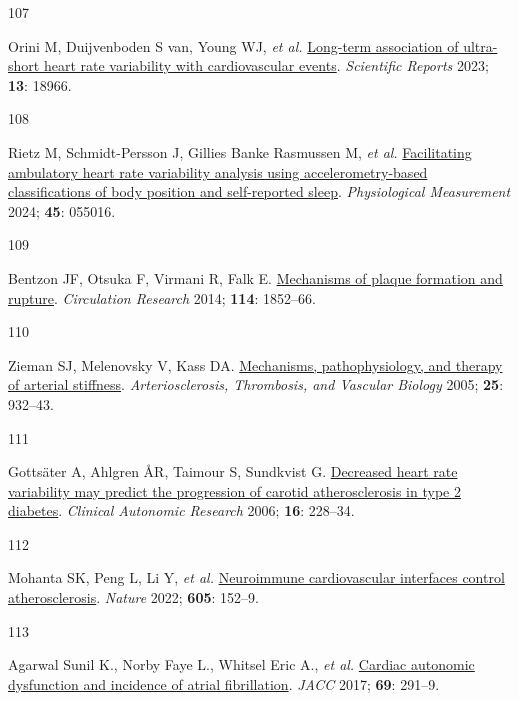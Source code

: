 \documentclass[
  a4paper,
  headsepline=true,
  open=any]{scrbook}
\newlength{\cslhangindent}
\newlength{\csllabelwidth}
\newlength{\cslentryspacingunit} %
\newenvironment{CSLReferences}[2] %
 {%
  \setlength{\parindent}{0pt}
  \ifodd #1
  \let\oldpar\par
  \def\par{\hangindent=\cslhangindent\oldpar}
  \fi
  \setlength{\parskip}{#2\cslentryspacingunit}
 }%
 {}
\newcommand{\CSLLeftMargin}[1]{\parbox[t]{\csllabelwidth}{#1}}
\newcommand{\CSLRightInline}[1]{\parbox[t]{\linewidth - \csllabelwidth}{#1}\break}
\begin{document}
\begin{CSLReferences}{0}{0}
\leavevmode{}%
\CSLLeftMargin{107 }%
\CSLRightInline{Orini M, Duijvenboden S van, Young WJ, \emph{et al.}
\href{https://doi.org/10.1038/s41598-023-45988-2}{Long-term association
of ultra-short heart rate variability with cardiovascular events}.
\emph{Scientific Reports} 2023; \textbf{13}: 18966.}

\leavevmode{}%
\CSLLeftMargin{108 }%
\CSLRightInline{Rietz M, Schmidt-Persson J, Gillies Banke Rasmussen M,
\emph{et al.}
\href{https://doi.org/10.1088/1361-6579/ad450d}{Facilitating ambulatory
heart rate variability analysis using accelerometry-based
classifications of body position and self-reported sleep}.
\emph{Physiological Measurement} 2024; \textbf{45}: 055016.}

\leavevmode{}%
\CSLLeftMargin{109 }%
\CSLRightInline{Bentzon JF, Otsuka F, Virmani R, Falk E.
\href{https://doi.org/10.1161/CIRCRESAHA.114.302721}{Mechanisms of
plaque formation and rupture}. \emph{Circulation Research} 2014;
\textbf{114}: 1852--66.}

\leavevmode{}%
\CSLLeftMargin{110 }%
\CSLRightInline{Zieman SJ, Melenovsky V, Kass DA.
\href{https://doi.org/10.1161/01.ATV.0000160548.78317.29}{Mechanisms,
pathophysiology, and therapy of arterial stiffness}.
\emph{Arteriosclerosis, Thrombosis, and Vascular Biology} 2005;
\textbf{25}: 932--43.}

\leavevmode{}%
\CSLLeftMargin{111 }%
\CSLRightInline{Gottsäter A, Ahlgren ÅR, Taimour S, Sundkvist G.
\href{https://doi.org/10.1007/s10286-006-0345-4}{Decreased heart rate
variability may predict the progression of carotid atherosclerosis in
type 2 diabetes}. \emph{Clinical Autonomic Research} 2006; \textbf{16}:
228--34.}

\leavevmode{}%
\CSLLeftMargin{112 }%
\CSLRightInline{Mohanta SK, Peng L, Li Y, \emph{et al.}
\href{https://doi.org/10.1038/s41586-022-04673-6}{Neuroimmune
cardiovascular interfaces control atherosclerosis}. \emph{Nature} 2022;
\textbf{605}: 152--9.}

\leavevmode{}%
\CSLLeftMargin{113 }%
\CSLRightInline{Agarwal Sunil K., Norby Faye L., Whitsel Eric A.,
\emph{et al.} \href{https://doi.org/10.1016/j.jacc.2016.10.059}{Cardiac
autonomic dysfunction and incidence of atrial fibrillation}. \emph{JACC}
2017; \textbf{69}: 291--9.}


\end{CSLReferences}
\end{document}
